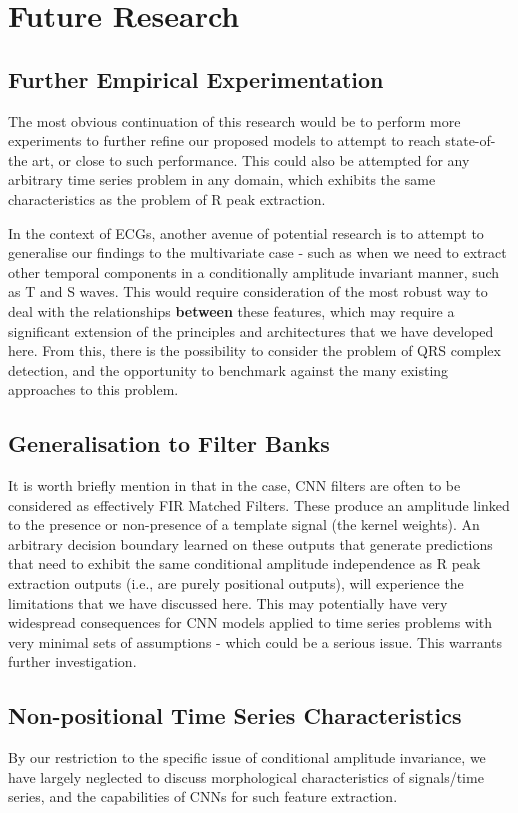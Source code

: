 \documentclass[9pt,conference]{IEEEtran}
\begin{document}
\section{Future Research}

\subsection{Further Empirical Experimentation}
The most obvious continuation of this research would be to perform more experiments to further refine our proposed models to attempt to reach state-of-the art, or close to such performance. This could also be attempted for any arbitrary time series problem in any domain, which exhibits the same characteristics as the problem of R peak extraction.

In the context of ECGs, another avenue of potential research is to attempt to generalise our findings to the multivariate case - such as when we need to extract other temporal components in a conditionally amplitude invariant manner, such as T and S waves. This would require consideration of the most robust way to deal with the relationships \textbf{between} these features, which may require a significant extension of the principles and architectures that we have developed here. From this, there is the possibility to consider the problem of QRS complex detection, and the opportunity to benchmark against the many existing approaches to this problem.

\subsection{Generalisation to Filter Banks}
It is worth briefly mention in that in the case, CNN filters are often to be considered as effectively FIR Matched Filters. These produce an amplitude linked to the presence or non-presence of a template signal (the kernel weights). An arbitrary decision boundary learned on these outputs that generate predictions that need to exhibit the same conditional amplitude independence as R peak extraction outputs (i.e., are purely positional outputs), will experience the limitations that we have discussed here. This may potentially have very widespread consequences for CNN models applied to time series problems with very minimal sets of assumptions - which could be a serious issue. This warrants further investigation.

\subsection{Non-positional Time Series Characteristics}
By our restriction to the specific issue of conditional amplitude invariance, we have largely neglected to discuss morphological characteristics of signals/time series, and the capabilities of CNNs for such feature extraction.
\end{document}
